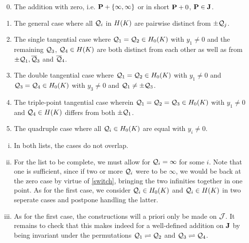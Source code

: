 \documentclass[english,11pt,a4paper]{article}
\begin{document}
\vspace{-3mm}
\fline
\vspace{-2mm}
\begin{enumerate}\setcounter{enumi}{-1}
	\parskip 1mm
	\item The addition with zero, i.e. $\P + \{ \infty, \infty \}$ or in short $\P + 0$, $\P \in \J$.
	\item The general case where all $\q_i$ in $\ek$ are pairwise distinct from $\pm \q_j$.
	\item The single tangential case where $\q_1 = \q_2 \in \enk$ with $y_1 \neq 0$ and the remaining $\q_3$, $\q_4 \in \ek$ are both distinct from each other as well as from $\pm \q_1, \bar \q_3$ and $\bar \q_4$.
	\item The double tangential case where $\q_1 = \q_2 \in \enk$ with $y_1 \neq 0$ and $\q_3 = \q_4 \in \enk$ with $y_3 \neq 0$ and $\q_1 \neq \pm \q_3$.
	\item The triple-point tangential case wherein $\q_1=\q_2=\q_3 \in \enk$ with $y_1 \neq 0$ and $\q_4 \in \ek$ differs from both $\pm \q_1$.
	\item The quadruple case where all $\q_i \in \enk$ are equal with $y_i\neq 0$.
\end{enumerate}
\vspace{-4mm}
\fline
\parskip 3mm

\begin{remark}\label{rem}\hfill
\begin{enumerate}[(i)]
	\item In both lists, the cases do not overlap.
	
	\item For the list to be complete, we must allow for $\q_i = \infty$ for some $i$. Note that one is sufficient, since if two or more $\q_i$ were to be $\infty$, we would be back at the zero case by virtue of \eqref{switch}, bringing the two infinities together in one point. As for the first case, we consider $\q_i \in \enk$ and $\q_i \in \ek$ in two seperate cases and postpone handling the latter.\label{extend}

	\item As for the first case, the constructions will a priori only be made on $\j$. It remains to check that this makes indeed for a well-defined addition on $\J$ by being invariant under the permutations $\q_1 \rightleftharpoons \q_2$ and $\q_3 \rightleftharpoons \q_4$.
\end{enumerate}
\end{remark}
\end{document}
